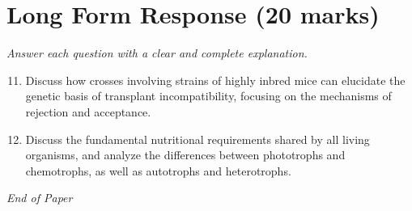 \documentclass[12pt]{article}
\begin{document}
\section*{Long Form Response (20 marks)}
\textit{Answer each question with a clear and complete explanation.}
\begin{enumerate}[label=\arabic*.]
\setcounter{enumi}{10}
\item Discuss how crosses involving strains of highly inbred mice can elucidate the genetic basis of transplant incompatibility, focusing on the mechanisms of rejection and acceptance.
\item Discuss the fundamental nutritional requirements shared by all living organisms, and analyze the differences between phototrophs and chemotrophs, as well as autotrophs and heterotrophs.
\end{enumerate}

\vfill
\noindent\textit{End of Paper}
\end{document}

